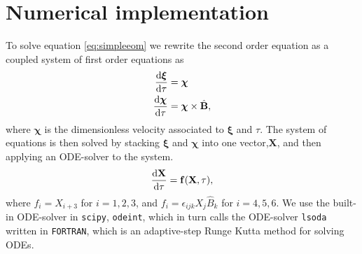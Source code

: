 \section{Numerical implementation}

To solve equation \ref{eq:simpleeom} we rewrite the second order equation as a coupled system of first order equations as
\begin{align}\label{eq:system}
	\frac{\text{d} \boldsymbol{\xi}}{\text{d} \tau} &= \boldsymbol{\chi} \\
	\frac{\text{d} \boldsymbol{\chi}}{\text{d} \tau} &= \boldsymbol{\chi} \times \hat{\mathbf{B}},
\end{align}
where $\boldsymbol{\chi}$ is the dimensionless velocity associated to $\boldsymbol{\xi}$ and $\tau$. The system of equations is then solved by stacking $\boldsymbol{\xi}$ and $\boldsymbol{\chi}$ into one vector,$\mathbf{X}$, and then applying an ODE-solver to the system.
\begin{equation}\label{eq:ODE}
	\frac{\text{d} \mathbf{X}}{\text{d} \tau} = \mathbf{f}(\mathbf{X},\tau),
\end{equation}
where $f_i = X_{i+3}$ for $i=1,2,3$, and $f_i = \epsilon_{ijk} X_j \hat{B}_k $ for $i=4,5,6$. We use the built-in ODE-solver in \texttt{scipy}, \texttt{odeint}, which in turn calls the ODE-solver \texttt{lsoda} written in \texttt{FORTRAN}, which is an adaptive-step Runge Kutta method for solving ODEs.

\newpage